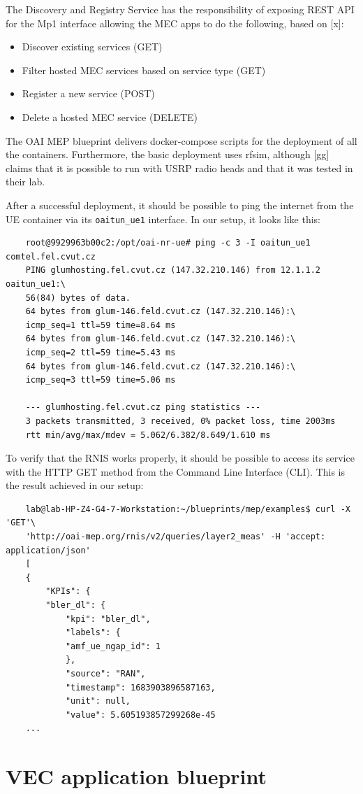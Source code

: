 \documentclass[12pt,a4paper,twoside]{report}
\begin{document}
The Discovery and Registry Service has the responsibility of exposing REST API for the Mp1 interface allowing the MEC apps to do the following, based on [x]:
\begin{itemize}
	\item Discover existing services (GET)
	\item Filter hosted MEC services based on service type (GET)
	\item Register a new service (POST)
	\item Delete a hosted MEC service (DELETE)
\end{itemize}
The OAI MEP blueprint delivers docker-compose scripts for the deployment of all the containers. Furthermore, the basic deployment uses rfsim, although [gg] claims that it is possible to run with USRP radio heads and that it was tested in their lab. 

After a successful deployment, it should be possible to ping the internet from the UE container via its \verb |oaitun_ue1| interface. In our setup, it looks like this:
\begin{verbatim}
	root@9929963b00c2:/opt/oai-nr-ue# ping -c 3 -I oaitun_ue1 comtel.fel.cvut.cz
	PING glumhosting.fel.cvut.cz (147.32.210.146) from 12.1.1.2 oaitun_ue1:\
	56(84) bytes of data.
	64 bytes from glum-146.feld.cvut.cz (147.32.210.146):\
	icmp_seq=1 ttl=59 time=8.64 ms
	64 bytes from glum-146.feld.cvut.cz (147.32.210.146):\
	icmp_seq=2 ttl=59 time=5.43 ms
	64 bytes from glum-146.feld.cvut.cz (147.32.210.146):\
	icmp_seq=3 ttl=59 time=5.06 ms

	--- glumhosting.fel.cvut.cz ping statistics ---
	3 packets transmitted, 3 received, 0% packet loss, time 2003ms
	rtt min/avg/max/mdev = 5.062/6.382/8.649/1.610 ms
\end{verbatim}

To verify that the RNIS works properly, it should be possible to access its service with the HTTP GET method from the Command Line Interface (CLI). This is the result achieved in our setup:
\begin{verbatim}
	lab@lab-HP-Z4-G4-7-Workstation:~/blueprints/mep/examples$ curl -X 'GET'\
	'http://oai-mep.org/rnis/v2/queries/layer2_meas' -H 'accept: application/json'
	[
	{
		"KPIs": {
		"bler_dl": {
			"kpi": "bler_dl",
			"labels": {
			"amf_ue_ngap_id": 1
			},
			"source": "RAN",
			"timestamp": 1683903896587163,
			"unit": null,
			"value": 5.605193857299268e-45
	...
\end{verbatim}

\section{VEC application blueprint}
\end{document}
